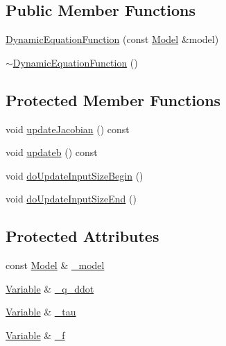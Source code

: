 \subsection*{Public Member Functions}
\begin{DoxyCompactItemize}
\item 
\hyperlink{classocra_1_1DynamicEquationFunction_ab6a38098b1aac7db298e0f3a93955624}{Dynamic\+Equation\+Function} (const \hyperlink{classocra_1_1Model}{Model} \&model)
\item 
\hyperlink{classocra_1_1DynamicEquationFunction_a84c82f21c1564aaca6b5aa703ecae73e}{$\sim$\+Dynamic\+Equation\+Function} ()
\end{DoxyCompactItemize}
\subsection*{Protected Member Functions}
\begin{DoxyCompactItemize}
\item 
void \hyperlink{classocra_1_1DynamicEquationFunction_a81d71c87d0f52b3d321614c6219022ad}{update\+Jacobian} () const
\item 
void \hyperlink{classocra_1_1DynamicEquationFunction_ae1fe835a481f5f0bde6c8b0fa8ea09b2}{updateb} () const
\item 
void \hyperlink{classocra_1_1DynamicEquationFunction_a6fc52fcd947fa303e55729dbb286b92c}{do\+Update\+Input\+Size\+Begin} ()
\item 
void \hyperlink{classocra_1_1DynamicEquationFunction_a8d20f6ed1e3983d1fddf648729eba955}{do\+Update\+Input\+Size\+End} ()
\end{DoxyCompactItemize}
\subsection*{Protected Attributes}
\begin{DoxyCompactItemize}
\item 
const \hyperlink{classocra_1_1Model}{Model} \& \hyperlink{classocra_1_1DynamicEquationFunction_ad0c5d639974a97aa3ed3f0bbe0f8189d}{\+\_\+model}
\item 
\hyperlink{classocra_1_1Variable}{Variable} \& \hyperlink{classocra_1_1DynamicEquationFunction_a8a6dfb64fcca3c42a9e7ad637706a6cc}{\+\_\+q\+\_\+ddot}
\item 
\hyperlink{classocra_1_1Variable}{Variable} \& \hyperlink{classocra_1_1DynamicEquationFunction_a60ba636a9028046969c5491ec7ed2f9e}{\+\_\+tau}
\item 
\hyperlink{classocra_1_1Variable}{Variable} \& \hyperlink{classocra_1_1DynamicEquationFunction_a70499af5c86e68836acb7251b37ab668}{\+\_\+f}
\end{DoxyCompactItemize}
